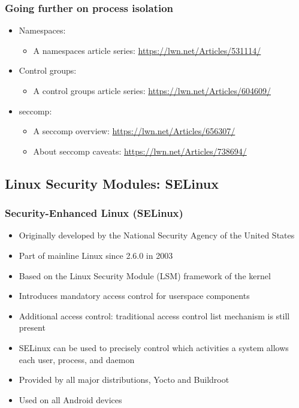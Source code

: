 \begin{frame}
	\frametitle{Going further on process isolation}
	\begin{itemize}
		\item Namespaces:
			\begin{itemize}
				\item A namespaces article series:
					\url{https://lwn.net/Articles/531114/}
			\end{itemize}
		\item Control groups:
			\begin{itemize}
				\item A control groups article series:
					\url{https://lwn.net/Articles/604609/}
			\end{itemize}
		\item seccomp:
			\begin{itemize}
				\item A seccomp overview: \url{https://lwn.net/Articles/656307/}
				\item About seccomp caveats: \url{https://lwn.net/Articles/738694/}
			\end{itemize}
	\end{itemize}
\end{frame}

\subsection{Linux Security Modules: SELinux}

\begin{frame}
	\frametitle{Security-Enhanced Linux (SELinux)}
	\begin{itemize}
		\item Originally developed by the National Security Agency of the United
			States
		\item Part of mainline Linux since 2.6.0 in 2003
		\item Based on the Linux Security Module (LSM) framework of the kernel
		\item Introduces mandatory access control for userspace components
		\item Additional access control: traditional access control list mechanism
			is still present
		\item SELinux can be used to precisely control which activities a system
			allows each user, process, and daemon
		\item Provided by all major distributions, Yocto and Buildroot
		\item Used on all Android devices
	\end{itemize}
\end{frame}


